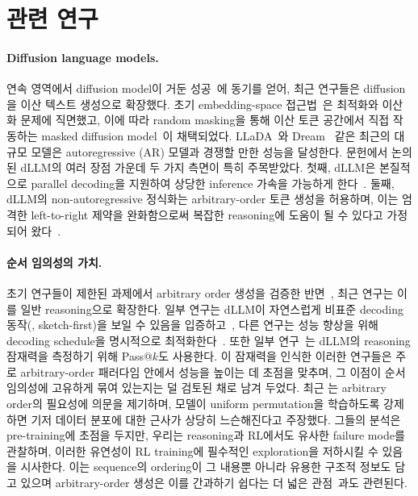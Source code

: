 \section{관련 연구}
\label{sec:related}


\paragraph{Diffusion language models.} 
연속 영역에서 diffusion model이 거둔 성공~\cite{ho2020denoising,rombach2022high}에 동기를 얻어, 최근 연구들은 diffusion을 이산 텍스트 생성으로 확장했다. 초기 embedding-space 접근법~\cite{diffusionlm,diffuseq,ssdlm}은 최적화와 이산화 문제에 직면했고, 이에 따라 random masking을 통해 이산 토큰 공간에서 직접 작동하는 masked diffusion model~\cite{sedd,mdlm,shi2024simplified,ou2024your}이 채택되었다.
LLaDA~\cite{nie2025large}와 Dream~\cite{ye2025dream} 같은 최근의 대규모 모델은 autoregressive (AR) 모델과 경쟁할 만한 성능을 달성한다.
문헌에서 논의된 dLLM의 여러 장점 가운데 두 가지 측면이 특히 주목받았다. 첫째, dLLM은 본질적으로 parallel decoding을 지원하여 상당한 inference 가속을 가능하게 한다~\cite{fastdllm,ben2025accelerated,labs2025mercury,geminidiffusion,song2025seed}. 둘째, dLLM의 non-autoregressive 정식화는 arbitrary-order 토큰 생성을 허용하며, 이는 엄격한 left-to-right 제약을 완화함으로써 복잡한 reasoning에 도움이 될 수 있다고 가정되어 왔다~\cite{ye2024beyond,kim2025train}.

\paragraph{순서 임의성의 가치.} 초기 연구들이 제한된 과제에서 arbitrary order 생성을 검증한 반면~\cite{ye2024beyond,nie2025large,kim2025train}, 최근 연구는 이를 일반 reasoning으로 확장한다. 일부 연구는 dLLM이 자연스럽게 비표준 decoding 동작(\eg, sketch-first)을 보일 수 있음을 입증하고~\cite{xie2025dream,gong2025diffucoder}, 다른 연구는 성능 향상을 위해 decoding schedule을 명시적으로 최적화한다~\cite{Peng2025PathPF,huang2025reinforcing}.
또한 일부 연구~\cite{gong2025diffucoder,hong2025improving,shen2026improvingdiffusionlanguagemodel}는 dLLM의 reasoning 잠재력을 측정하기 위해 Pass@$k$도 사용한다.
이 잠재력을 인식한 이러한 연구들은 주로 arbitrary-order 패러다임 안에서 성능을 높이는 데 초점을 맞추며, 그 이점이 순서 임의성에 고유하게 묶여 있는지는 덜 검토된 채로 남겨 두었다.
최근 \cite{du2025understanding}는 arbitrary order의 필요성에 의문을 제기하며, 모델이 uniform permutation을 학습하도록 강제하면 기저 데이터 분포에 대한 근사가 상당히 느슨해진다고 주장했다.
그들의 분석은 pre-training에 초점을 두지만, 우리는 reasoning과 RL에서도 유사한 failure mode를 관찰하며, 이러한 유연성이 RL training에 필수적인 exploration을 저하시킬 수 있음을 시사한다.
이는 sequence의 ordering이 그 내용뿐 아니라 유용한 구조적 정보도 담고 있으며 arbitrary-order 생성은 이를 간과하기 쉽다는 더 넓은 관점~\cite{varshney2006toward}과도 관련된다.

